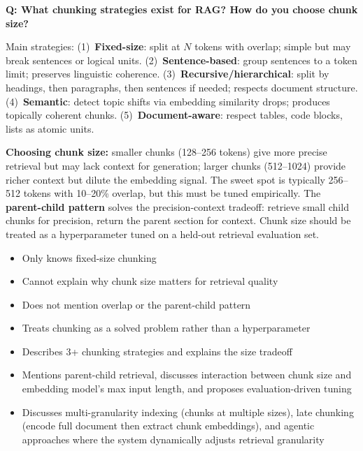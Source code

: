 \begin{interviewq}
\textbf{Q: What chunking strategies exist for RAG? How do you choose chunk
size?}

 \quad {} \quad \badgefreq{\freqhigh}

\stronganswer
Main strategies: (1)~\textbf{Fixed-size}: split at $N$ tokens with overlap;
simple but may break sentences or logical units.  (2)~\textbf{Sentence-based}:
group sentences to a token limit; preserves linguistic coherence.
(3)~\textbf{Recursive/hierarchical}: split by headings, then paragraphs, then
sentences if needed; respects document structure.  (4)~\textbf{Semantic}:
detect topic shifts via embedding similarity drops; produces topically coherent
chunks.  (5)~\textbf{Document-aware}: respect tables, code blocks, lists as
atomic units.

\textbf{Choosing chunk size:} smaller chunks (128--256 tokens) give more
precise retrieval but may lack context for generation; larger chunks (512--1024)
provide richer context but dilute the embedding signal.  The sweet spot is
typically 256--512 tokens with 10--20\% overlap, but this must be tuned
empirically.  The \textbf{parent-child pattern} solves the precision-context
tradeoff: retrieve small child chunks for precision, return the parent section
for context.  Chunk size should be treated as a hyperparameter tuned on a
held-out retrieval evaluation set.

\redflags
\begin{itemize}
    \item Only knows fixed-size chunking
    \item Cannot explain why chunk size matters for retrieval quality
    \item Does not mention overlap or the parent-child pattern
    \item Treats chunking as a solved problem rather than a hyperparameter
\end{itemize}


\goodgreat
\begin{itemize}
    \item {} Describes 3+ chunking strategies and explains the size tradeoff
    \item {} Mentions parent-child retrieval, discusses interaction between
          chunk size and embedding model's max input length, and proposes evaluation-driven
          tuning
    \item {} Discusses multi-granularity indexing (chunks at multiple sizes),
          late chunking (encode full document then extract chunk embeddings), and
          agentic approaches where the system dynamically adjusts retrieval granularity
\end{itemize}


\end{interviewq}
